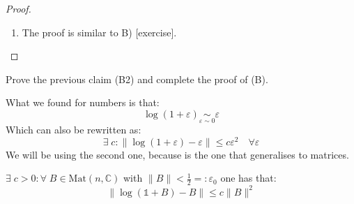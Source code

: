 \documentclass[../main.tex]{subfiles}
\begin{document}
\begin{proof}
\begin{enumerate}
\begin{enumerate}
\[\begin{pmatrix}
0 & & \ddots
\end{pmatrix}
S^{-1}
\]
If now we take the limit of $N\to\infty$ on both sides, we have that, since $S$ is \textbf{continuous}, the limit goes inside the matrix on the right hand side:
\[
\log(A)=S\begin{pmatrix}
\log(\lambda_1) & & 0\\
& \ddots & \\
0 & & \log(\lambda_n)
\end{pmatrix}
S^{-1}
\]
Now that we reduced to diagonal matrices it is easy:
\[
\Rightarrow\ e^{\log(A)}=e^{S\log(D)S^{-1}}\overset{\mathclap{\tikz \node {$\downarrow$} node [above=1.25ex] {\footnotesize \refprop{exp-prop}};}}{=}Se^{\log(D)}S^{-1}\underset{\mathclap{\tikz \node {$\uparrow$} node [below=1ex] {\footnotesize Facts from complex analysis };}}{=}SDS^{-1}=A
\]
\item General case: $A$ is \textbf{non-diagonalizable}. We know from linear algebra that each $A\in\text{Mat}(n,\mathbb{C})$ can be approximated by a sequence $\{A_m\}_{m\in\mathbb{N}}$ of \textbf{diagonalizable matrices} so that $A_m$ converges in norm:
\[
A_m\xrightarrow[m\to\infty]{\lVert\dots\rVert}A
\]
    \end{enumerate}
    \item The proof is similar to B) [exercise].
\end{enumerate}
\end{proof}
\begin{starredExercise}
Prove the previous claim (B2) and complete the proof of (B).
\end{starredExercise}
What we found for numbers is that:
\[
\log(1+\varepsilon)\underset{{\varepsilon\sim0}}{\sim}\varepsilon
\]
Which can also be rewritten as:
\[
\exists\; c:\lVert\log(1+\varepsilon)-\varepsilon\rVert\le c\varepsilon^2 \quad \forall\varepsilon
\]
We will be using the second one, because is the one that generalises to matrices.
\begin{proposition}
$\exists\; c>0:\forall\; B\in\text{Mat}(n,\mathbb{C})$ with {\color{red}$\lVert B\rVert<\frac{1}{2}=:\varepsilon_0$} one has that:
\[
\lVert\log(\mathbb{1}+B)-B\rVert\le c\lVert B\rVert^2
\]
\end{proposition}
\end{document}
